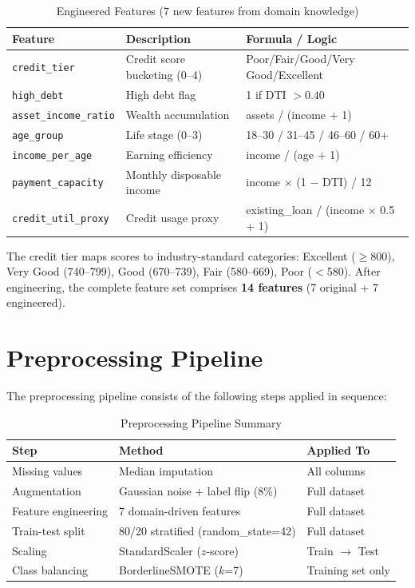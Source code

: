 \documentclass[12pt]{report}
\begin{document}
\begin{table}[H]
\centering
\caption{Engineered Features (7 new features from domain knowledge)}
\label{tab:engineered_features}
\begin{tabular}{lp{4.5cm}l}
\toprule
\textbf{Feature} & \textbf{Description} & \textbf{Formula / Logic} \\
\midrule
\texttt{credit\_tier} & Credit score bucketing (0--4) & Poor/Fair/Good/Very Good/Excellent \\
\texttt{high\_debt} & High debt flag & 1 if DTI $> 0.40$ \\
\texttt{asset\_income\_ratio} & Wealth accumulation & assets / (income + 1) \\
\texttt{age\_group} & Life stage (0--3) & 18--30 / 31--45 / 46--60 / 60+ \\
\texttt{income\_per\_age} & Earning efficiency & income / (age + 1) \\
\texttt{payment\_capacity} & Monthly disposable income & income $\times$ (1 $-$ DTI) / 12 \\
\texttt{credit\_util\_proxy} & Credit usage proxy & existing\_loan / (income $\times$ 0.5 + 1) \\
\bottomrule
\end{tabular}
\end{table}

The credit tier maps scores to industry-standard categories: Excellent ($\geq$800), Very Good (740--799), Good (670--739), Fair (580--669), Poor ($<$580). After engineering, the complete feature set comprises \textbf{14 features} (7 original + 7 engineered).


\section{Preprocessing Pipeline}

The preprocessing pipeline consists of the following steps applied in sequence:

\begin{table}[H]
\centering
\caption{Preprocessing Pipeline Summary}
\label{tab:preprocessing_summary}
\begin{tabular}{lll}
\toprule
\textbf{Step} & \textbf{Method} & \textbf{Applied To} \\
\midrule
Missing values & Median imputation & All columns \\
Augmentation & Gaussian noise + label flip (8\%) & Full dataset \\
Feature engineering & 7 domain-driven features & Full dataset \\
Train-test split & 80/20 stratified (random\_state=42) & Full dataset \\
Scaling & StandardScaler ($z$-score) & Train $\rightarrow$ Test \\
Class balancing & BorderlineSMOTE ($k$=7) & Training set only \\
\bottomrule
\end{tabular}
\end{table}
\end{document}
